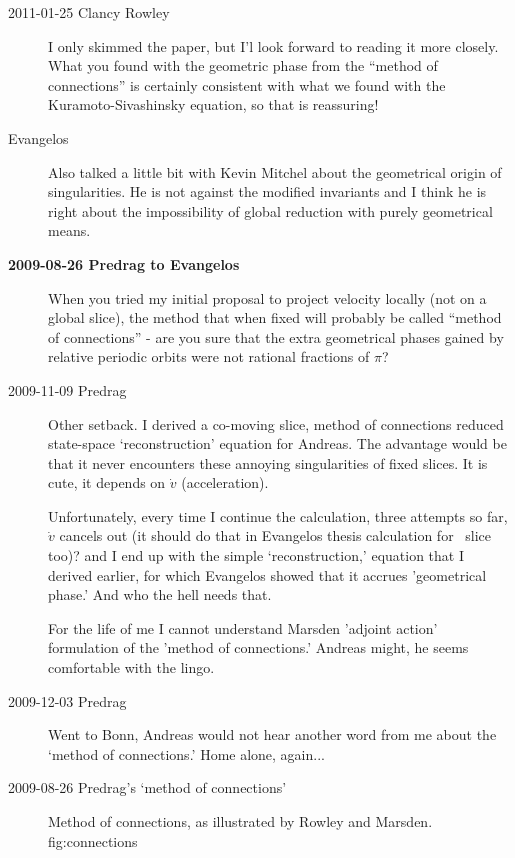 \begin{description}
\item[2011-01-25 Clancy Rowley]
I only skimmed the paper, but I'l look forward
to reading it more closely.  What you found with the geometric phase from
the ``method of connections'' is certainly consistent with what we found
with the Kuramoto-Sivashinsky equation, so that is reassuring!

\item[Evangelos]
Also talked a little bit with Kevin Mitchel about the geometrical origin
of singularities. He is not against the modified invariants and I think
he is right about the impossibility of global reduction with purely
geometrical means.

\item[\bf 2009-08-26 Predrag to Evangelos] When you tried my initial
proposal to project velocity locally (not on a global slice),
the method that when fixed will probably be called ``method
of connections'' - are you sure that the extra geometrical
phases gained by relative periodic orbits were not rational fractions of $\pi$?

\item[2009-11-09 Predrag]
Other setback. I derived a co-moving slice, method of
connections reduced state-space `reconstruction' equation for
Andreas. The advantage would be that it never encounters these
annoying singularities of fixed slices. It is cute, it depends
on $\dot{v}$ (acceleration).

Unfortunately, every time I continue the calculation, three
attempts so far, $\dot{v}$ cancels out (it should do that in
Evangelos thesis calculation for \reqv\ slice too)? and I end
up with the simple `reconstruction,' equation that I derived
earlier, for which Evangelos showed that it accrues
'geometrical phase.' And who the hell needs that.

For the life of me I cannot understand Marsden 'adjoint action'
formulation of the 'method of connections.' Andreas might, he
seems comfortable with the lingo.

\item[2009-12-03 Predrag] Went to Bonn, Andreas would not hear
another word from me about the `method of connections.' Home
alone, again...



\item[2009-08-26 Predrag's `method of connections']

%
{}{
Method of connections, as illustrated by Rowley and
Marsden.
}
{fig:connections}
%



\end{description}
